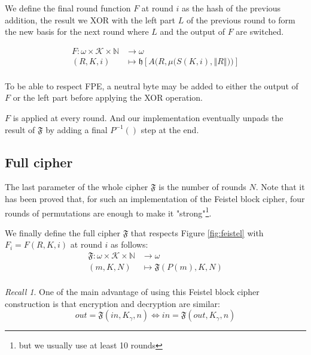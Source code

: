 \documentclass[twoside,twocolumn]{article}
\newcommand{\norm}[1]{\left\Vert#1\right\Vert}
\theoremstyle{definition}
\theoremstyle{remark}
\newtheorem*{recall}{Recall}
\begin{document}
We define the final round function $F$ at round $i$ as the hash of the previous addition, the result we XOR with the left part $L$ of the previous 
round to form the new basis for the next round where $L$ and the output of $F$ are switched.
\begin{small}
    \begin{equation}
        \label{eq:roundFunction}
        \begin{array}{rl}
            F: \omega \times \mathcal{K} \times \mathbb{N}  &\to \omega \\
                (R, K, i)  &\mapsto \mathfrak{h} \left[ A \Bigg(R, \mu \Big( S(K,i), \norm{R} \Big) \Bigg) \right] \\
        \end{array}
    \end{equation}
\end{small}

To be able to respect FPE, a neutral byte may be added to either the output of $F$ or the left part before applying the XOR operation.

$F$ is applied at every round. And our implementation eventually unpads the result of $\mathfrak{F}$ by adding a final $P^{-1}()$ step at the end.

\subsection{Full cipher}

The last parameter of the whole cipher $\mathfrak{F}$ is the number of rounds $N$.
Note that it has been proved \cite{Permutations:lr} that, for such an implementation of the Feistel block cipher, four rounds of permutations are 
enough to make it "strong"\footnote{but we usually use at least 10 rounds}.

We finally define the full cipher $\mathfrak{F}$ that respects Figure \ref{fig:feistel} with $F_i = F(R, K, i)$ at round $i$ as follows:
\begin{equation}
    \label{eq:fullCipher}
    \begin{array}{rl}
        \mathfrak{F}: \omega \times \mathcal{K} \times \mathbb{N} &\to \omega \\
                        (m, K, N) &\mapsto \mathfrak{F}(P(m), K, N) \\
    \end{array}
\end{equation}

\begin{recall}
    One of the main advantage of using this Feistel block cipher construction is that encryption and decryption are similar:$$
        out = \mathfrak{F}(in, K_\gamma, n) \iff in = \mathfrak{F}(out, K_\gamma, n)
    $$
\end{recall}
\end{document}
